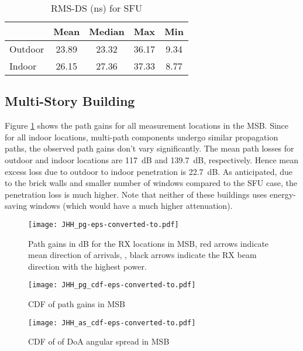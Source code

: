 \documentclass[conference]{IEEEtran}
\begin{document}
\begin{table}[h]  
\centering \normalsize \caption{RMS-DS (ns) for SFU}
  \begin{tabular} {l|c|c|c|c}
    & Mean & Median & Max & Min \\ \hline
    Outdoor &  23.89 &  23.32 & 36.17  &  9.34 \\
    Indoor & 26.15 & 27.36 & 37.33 &   8.77  \\
  \end{tabular}\label{tab:rmsds}
\end{table}


\subsection{Multi-Story Building}

Figure \ref{fig:JHH_pg} shows the path gains for all measurement locations in the MSB. Since for all indoor locations, multi-path components undergo similar propagation paths, the observed path gains don't vary significantly. The mean path losses for outdoor and indoor locations are \SI{117}{dB} and \SI{139.7}{dB}, respectively. Hence mean excess loss due to outdoor to indoor penetration is \SI{22.7}{dB}. As anticipated, due to the brick walls and smaller number of windows compared to the SFU case, the penetration loss is much higher. Note that neither of these buildings uses energy-saving windows (which would have a much higher attenuation).


\begin{figure}[tbp]
        \centering\texttt{[image: JHH\_pg-eps-converted-to.pdf]}\caption{Path gains in dB for the RX locations in MSB, red arrows indicate mean direction of arrivals, , black arrows indicate the RX beam direction with the highest power.}\label{fig:JHH_pg}
\end{figure}

\begin{figure}[tbp]
        \centering\texttt{[image: JHH\_pg\_cdf-eps-converted-to.pdf]}\caption{CDF of path gains in MSB}\label{fig:JHH_pg_cdf}
\end{figure}


\begin{figure}[tbp]
        \centering\texttt{[image: JHH\_as\_cdf-eps-converted-to.pdf]}\caption{CDF of of DoA angular spread in MSB}\label{fig:JHH_as_cdf}
\end{figure}
\end{document}
